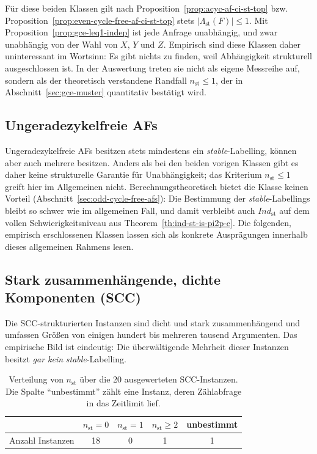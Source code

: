 F\"ur diese beiden Klassen gilt nach
Proposition~\ref{prop:acyc-af-ci-st-top} bzw.
Proposition~\ref{prop:even-cycle-free-af-ci-st-top} stets
\(|\Lambda_{\mathrm{st}}(F)|\leq 1\). Mit
Proposition~\ref{prop:gce-leq1-indep} ist jede Anfrage unabh\"angig, und zwar
unabh\"angig von der Wahl von \(X\), \(Y\) und \(Z\). Empirisch sind diese
Klassen daher uninteressant im Wortsinn: Es gibt nichts zu finden, weil
Abh\"angigkeit strukturell ausgeschlossen ist. In der Auswertung treten sie
nicht als eigene Messreihe auf, sondern als der theoretisch verstandene
Randfall \(n_{\mathrm{st}}\leq 1\), der in
Abschnitt~\ref{sec:gce-muster} quantitativ best\"atigt wird.

\subsection{Ungeradezykelfreie AFs}
\label{subsec:gce-odd}

Ungeradezykelfreie AFs besitzen stets mindestens ein
\textit{stable}-Labelling, k\"onnen aber auch mehrere besitzen. Anders als bei
den beiden vorigen Klassen gibt es daher keine strukturelle Garantie f\"ur
Unabh\"angigkeit; das Kriterium \(n_{\mathrm{st}}\leq 1\) greift hier im
Allgemeinen nicht. Berechnungstheoretisch bietet die Klasse keinen Vorteil
(Abschnitt~\ref{sec:odd-cycle-free-afs}): Die Bestimmung der
\textit{stable}-Labellings bleibt so schwer wie im allgemeinen Fall, und damit
verbleibt auch \(\textit{Ind}_{\mathrm{st}}\) auf dem vollen
Schwierigkeitsniveau aus Theorem~\ref{th:ind-st-is-pi2p-c}. Die folgenden,
empirisch erschlossenen Klassen lassen sich als konkrete Auspr\"agungen
innerhalb dieses allgemeinen Rahmens lesen.

\subsection{Stark zusammenh\"angende, dichte Komponenten (SCC)}
\label{subsec:gce-scc}

Die SCC-strukturierten Instanzen sind dicht und stark zusammenh\"angend und
umfassen Gr\"o\ss en von einigen hundert bis mehreren tausend Argumenten. Das
empirische Bild ist eindeutig: Die \"uberw\"altigende Mehrheit dieser Instanzen
besitzt \emph{gar kein} \textit{stable}-Labelling.

\begin{table}[htbp]
    \myfloatalign
    \begin{tabularx}{\textwidth}{Xcccc} \toprule
        & \(n_{\mathrm{st}}=0\) & \(n_{\mathrm{st}}=1\) &
          \(n_{\mathrm{st}}\geq2\) & unbestimmt \\ \midrule
        Anzahl Instanzen & 18 & 0 & 1 & 1 \\
        \bottomrule
    \end{tabularx}
    \caption[Stabile Labellings in SCC-Instanzen]{Verteilung von
    \(n_{\mathrm{st}}\) \"uber die 20 ausgewerteten SCC-Instanzen. Die Spalte
    \enquote{unbestimmt} z\"ahlt eine Instanz, deren Z\"ahlabfrage in das
    Zeitlimit lief.}
    \label{tab:gce-scc}
\end{table}

